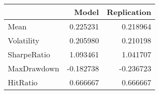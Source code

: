 \begin{tabular}{lrr}
\toprule
{} &     Model &  Replication \\
\midrule
Mean        &  0.225231 &     0.218964 \\
Volatility  &  0.205980 &     0.210198 \\
SharpeRatio &  1.093461 &     1.041707 \\
MaxDrawdown & -0.182738 &    -0.236723 \\
HitRatio    &  0.666667 &     0.666667 \\
\bottomrule
\end{tabular}
